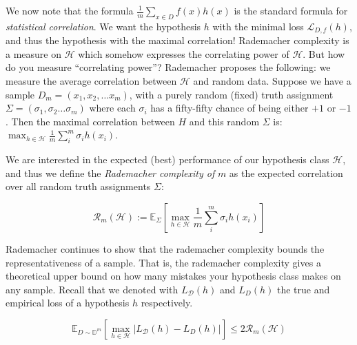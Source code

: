 \documentclass{bigdata}
\begin{document}
We now note that the formula $\frac{1}{m}\sum_{x \in D} f(x)h(x)$ is the standard formula for \emph{statistical correlation}. We want the hypothesis $h$ with the minimal loss $\mathcal{L}_{D, f}(h)$, and thus the hypothesis with the maximal correlation! Rademacher complexity is a measure on $\mathcal{H}$ which somehow expresses the correlating power of $\mathcal{H}$. But how do you measure ``correlating power''? Rademacher proposes the following: we measure the average correlation between $\mathcal{H}$ and random data. Suppose we have a sample $D_m = (x_1, x_2, \dots x_m)$, with a purely random (fixed) truth assignment $\Sigma = (\sigma_1, \sigma_2 \dots \sigma_m)$ where each $\sigma_i$ has a fifty-fifty chance of being either $+1$ or $-1$. Then the maximal correlation between $H$ and this random $\Sigma$ is: $\max_{h \in \mathcal{H}} \frac{1}{m}\sum_i^m \sigma_i h(x_i)$.

\newpage 
We are interested in the expected (best) performance of our hypothesis class $\mathcal{H}$, and thus we define the \emph{Rademacher complexity of} $m$ as the expected correlation over all random truth assignments $\Sigma$:

\begin{equation*}
    \mathcal{R}_m(\mathcal{H}) := \mathbb{E}_\Sigma \left[ \max_{h \in \mathcal{H}} \frac{1}{m}\sum_i^m \sigma_i h(x_i) \right]
\end{equation*}

Rademacher continues to show that the rademacher complexity bounds the representativeness of a sample. That is, the rademacher complexity gives a theoretical upper bound on how many mistakes your hypothesis class makes on any sample. Recall that we denoted with $L_\mathcal{D}(h)$ and $L_D(h)$ the true and empirical loss of a hypothesis $h$ respectively.


\begin{equation*}
    \mathbb{E}_{D \sim \mathbb{D}^m} \left[ \max_{h \in \mathcal{H}} | L_\mathcal{D}(h) - L_D(h)| \right] \le 2 \mathcal{R}_m(\mathcal{H})
\end{equation*}
\end{document}
